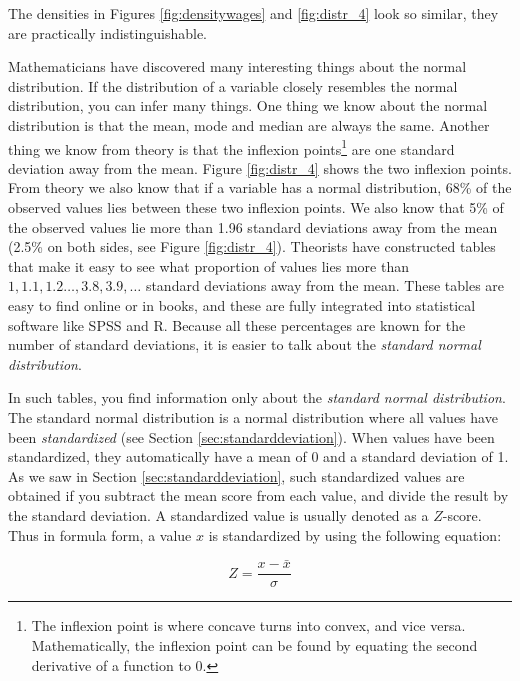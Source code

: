 \documentclass[]{book}\usepackage[]{graphicx}\usepackage[]{color}
\begin{document}
The densities in Figures \ref{fig:densitywages} and \ref{fig:distr_4} look so similar, they are practically indistinguishable.

Mathematicians have discovered many interesting things about the normal distribution. If the distribution of a variable closely resembles the normal distribution, you can infer many things. One thing we know about the normal distribution is that the mean, mode and median are always the same. Another thing we know from theory is that the inflexion points\footnote{The inflexion point is where concave turns into convex, and vice versa. Mathematically, the inflexion point can be found by equating the second derivative of a function to 0.} are one standard deviation away from the mean.  Figure \ref{fig:distr_4} shows the two inflexion points. From theory we also know that if a variable has a normal distribution, 68\% of the observed values lies between these two inflexion points. We also know that 5\% of the observed values lie more than 1.96 standard deviations away from the mean (2.5\% on both sides, see Figure \ref{fig:distr_4}). Theorists have constructed tables that make it easy to see what proportion of values lies more than $1, 1.1, 1.2 \dots, 3.8, 3.9, \dots$ standard deviations away from the mean. These tables are easy to find online or in books, and these are fully integrated into statistical software like SPSS and R. Because all these percentages are known for the number of standard deviations, it is easier to talk about the \textit{standard normal distribution}.

In such tables, you find information only about the \textit{standard normal distribution}. The standard normal distribution is a normal distribution where all values have been \textit{standardized} (see Section \ref{sec:standarddeviation}). When values have been standardized, they automatically have a mean of 0 and a standard deviation of 1. As we saw in Section \ref{sec:standarddeviation}, such standardized values are obtained if you subtract the mean score from each value, and divide the result by the standard deviation. A standardized value is usually denoted as a $Z$-score. Thus in formula form, a value $x$ is standardized by using the following equation:


\begin{equation}
Z = \frac{x - \bar{x}}{\sigma}
\end{equation}
\end{document}
